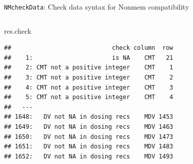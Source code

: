 \documentclass[
  8pt,
  ignorenonframetext,
  aspectratio=169]{beamer}
\newenvironment{Shaded}{\begin{snugshade}}{\end{snugshade}}
\newcommand{\NormalTok}[1]{#1}
\begin{document}
\begin{frame}[fragile]{\texttt{NMcheckData}: Check data syntax for
Nonmem compatibility}
\begin{columns}[T]
\begin{column}{0.48\textwidth}
\begin{Shaded}
\begin{Highlighting}[]
\NormalTok{res.check}
\end{Highlighting}
\end{Shaded}

\begin{verbatim}
##                            check column  row
##    1:                      is NA    CMT   21
##    2: CMT not a positive integer    CMT    1
##    3: CMT not a positive integer    CMT    2
##    4: CMT not a positive integer    CMT    3
##    5: CMT not a positive integer    CMT    4
##   ---                                       
## 1648:   DV not NA in dosing recs    MDV 1453
## 1649:   DV not NA in dosing recs    MDV 1463
## 1650:   DV not NA in dosing recs    MDV 1473
## 1651:   DV not NA in dosing recs    MDV 1483
## 1652:   DV not NA in dosing recs    MDV 1493
\end{verbatim}
\end{column}
\end{columns}
\end{frame}
\end{document}
